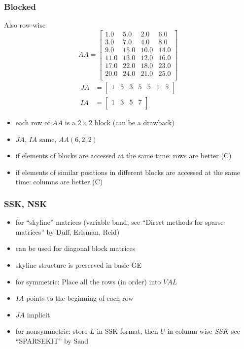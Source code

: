 \documentclass[10pt]{beamer}
\begin{document}
\begin{frame}
\frametitle{Blocked}
Also row-wise
\begin{equation*}
  AA =
\begin{bmatrix}
  1.0 & 5.0 & 2.0 & 6.0\\
  3.0 & 7.0 & 4.0 & 8.0\\
  9.0 & 15.0 & 10.0 & 14.0\\
  11.0 & 13.0 & 12.0 & 16.0\\
  17.0 & 22.0 & 18.0 & 23.0\\
  20.0 & 24.0 & 21.0 & 25.0\\
\end{bmatrix}
\end{equation*}
\begin{align*}
  JA &= 
\begin{bmatrix}
  1 & 5 & 3 & 5 & 5 & 1 & 5\\
\end{bmatrix}\\
  IA &= 
\begin{bmatrix}
  1 & 3 & 5 & 7\\
\end{bmatrix}
\end{align*}
  \begin{itemize}
    \item each row of $AA$ is a $2\times 2$ block (can be a drawback)
    \item $JA$, $IA$ same, $AA(6,2,2)$
    \item if elements of blocks are accessed at the same time: rows
are better (C)
    \item if elements of similar positions in different blocks are
accessed at the same time: columns are better (C)
  \end{itemize}
\end{frame}
\begin{frame}
\frametitle{SSK, NSK}
  \begin{itemize}
  \item for ``skyline'' matrices (variable band, {\tiny{see ``Direct
methods for sparse matrices'' by Duff, Erisman, Reid}})
  \item can be used for diagonal block matrices
  \item skyline structure is preserved in basic GE
  \item for symmetric: Place all the rows (in order) into $VAL$
  \item $IA$ points to the beginning of each row
  \item $JA$ implicit
  \item for nonsymmetric: store $L$ in SSK format, then $U$ in
column-wise $SSK$  {\tiny see ``SPARSEKIT'' by Saad}
  \end{itemize}
\begin{center}
\end{center}
\end{frame}
\end{document}
